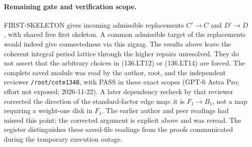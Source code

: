 \paragraph{Remaining gate and verification scope.}
FIRST-SKELETON gives incoming admissible replacements
\(C'\to C\) and \(D'\to D\), with shared free first
skeleton. A common admissible target of the replacements
would indeed give connectedness via this zigzag. The
results above leave the coherent integral period lattice
through the higher repairs unresolved. They do not assert
that the arbitrary choices in (136.LT12) or (136.LT14)
are forced.
The complete saved module was read by the author, root, and
the independent reviewer \texttt{/root/cote1348}, with PASS
in these exact scopes (GPT-6 Astra Pro; effort not exposed;
2026-11-22). A later dependency recheck by that reviewer
corrected the direction of the standard-factor edge map:
it is \(F_1\to B_1\), not a map requiring a weight-one disk
in \(F_1\). The earlier author and peer readings had missed
this point; the corrected argument is explicit above and
was reread. The register distinguishes these saved-file
readings from the proofs communicated during the temporary
execution outage.
